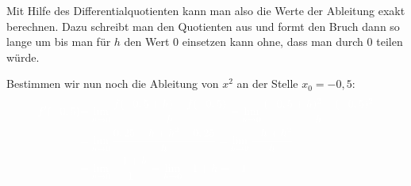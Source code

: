 \medskip

Mit Hilfe des Differentialquotienten kann man also die Werte der Ableitung exakt berechnen. Dazu schreibt man den Quotienten aus und formt den Bruch dann so lange um bis man für \(h\) den Wert \(0\) einsetzen kann ohne, dass man durch \(0\) teilen würde.

Bestimmen wir nun noch die Ableitung von \(x^2\) an der Stelle \(x_0=-0,5\):
\begin{align*}
	\textcolor{loes}{f'(-0,5)}&\textcolor{loes}{=\lim\limits_{h\to 0}\frac{f(-0,5+h)-f(-0,5)}{h}=\lim\limits_{h\to 0}\frac{(-0,5+h)^2-(-0,5)^2}{h}}\\
	&\textcolor{loes}{=\lim\limits_{h\to 0}\frac{0,25-h+h^2-0,25}{h}=\lim\limits_{h\to 0}\frac{-h+h^2}{h}}\\
	&\textcolor{loes}{=\lim\limits_{h\to 0}\frac{-1+h}{1}=\lim\limits_{h\to 0}-1+h=-1}
\end{align*}
\newpage
\begin{Exercise}[title={\raggedright Schätze jeweils die Ableitung an den Stellen -2 und 1 ab und berechne den Wert dann exakt.}, label=momA1]

    \begin{minipage}{\textwidth}
		\begin{minipage}{\textwidth}
		\end{minipage}%

        \medskip

		\begin{minipage}{\textwidth}
		\end{minipage}%
    \end{minipage}
\end{Exercise}
